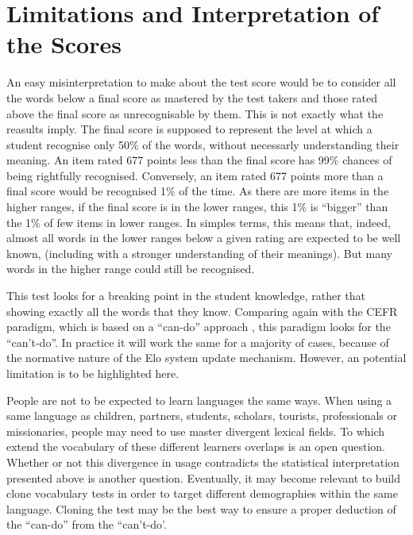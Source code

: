 \section{Limitations and Interpretation of the Scores}
An easy misinterpretation to make about the test score would be to consider all the words below a final score as mastered by the test takers and those rated above the final score as unrecognisable by them. This is not exactly what the reasults imply. The final score is supposed to represent the level at which a student recognise only 50\% of the words, without necessarly understanding their meaning. An item rated 677 points less than the final score has 99\% chances of being rightfully recognised. Conversely, an item rated 677 points more than a final score would be recognised 1\% of the time. As there are more items in the higher ranges, if the final score is in the lower ranges, this 1\% is ``bigger'' than the 1\% of few items in lower ranges. In simples terms, this means that, indeed, almost all words in the lower ranges below a given rating are expected to be well known, (including with a stronger understanding of their meanings). But many words in the higher range could still be recognised.

This test looks for a breaking point in the student knowledge, rather that showing exactly all the words that they know. Comparing again with the CEFR paradigm, which is based on a ``can-do'' approach \parencite{europe_common_2020}, this paradigm looks for the ``can't-do''. In practice it will work the same for a majority of cases, because of the normative nature of the Elo system update mechanism. However, an potential limitation is to be highlighted here.

People are not to be expected to learn languages the same ways. When using a same language as children, partners, students, scholars, tourists, professionals or missionaries, people may need to use master divergent lexical fields. To which extend the vocabulary of these different learners overlaps is an open question. Whether or not this divergence in usage contradicts the statistical interpretation presented above is another question. Eventually, it may become relevant to build clone vocabulary tests in order to target different demographies within the same language. Cloning the test may be the best way to ensure a proper deduction of the ``can-do'' from the ``can't-do'.

